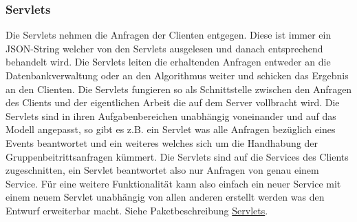 \begin {center}
\end {center}

	\subsubsection{Servlets}

	Die Servlets nehmen die Anfragen der Clienten entgegen. Diese ist immer ein JSON-String welcher von den Servlets ausgelesen und danach entsprechend behandelt wird. Die Servlets leiten die erhaltenden Anfragen entweder an die Datenbankverwaltung oder an den Algorithmus weiter und schicken das Ergebnis an den Clienten.
Die Servlets fungieren so als Schnittstelle zwischen den Anfragen des Clients und der eigentlichen Arbeit die auf dem Server vollbracht wird. 
Die Servlets sind in ihren Aufgabenbereichen unabhängig voneinander und auf das Modell angepasst, so gibt es z.B. ein Servlet was alle Anfragen bezüglich eines Events beantwortet und ein weiteres welches sich um die Handhabung der Gruppenbeitrittsanfragen kümmert.
Die Servlets sind auf die Services des Clients zugeschnitten, ein Servlet beantwortet also nur Anfragen von genau einem Service.
Für eine weitere Funktionalität kann also einfach ein neuer Service mit einem neuem Servlet unabhängig von allen anderen erstellt werden was den Entwurf erweiterbar macht.   
\newline
Siehe Paketbeschreibung \hyperlink{servlet}{Servlets}.

